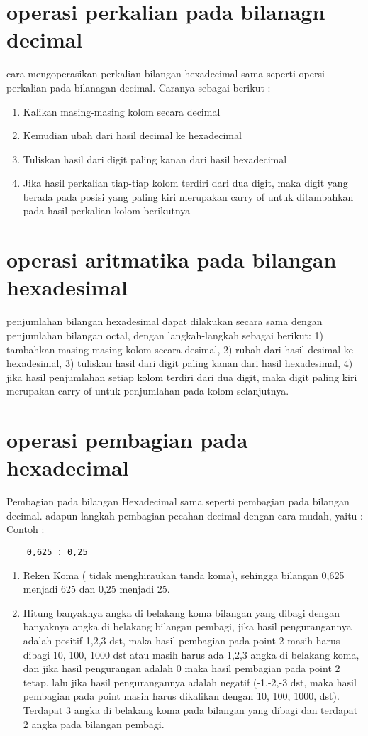 \section{operasi perkalian pada bilanagn decimal}
cara mengoperasikan perkalian bilangan hexadecimal sama seperti opersi perkalian pada bilanagan decimal. Caranya sebagai berikut :
	\begin{enumerate}
		\item Kalikan masing-masing kolom secara decimal
		\item Kemudian ubah dari hasil decimal ke hexadecimal
		\item Tuliskan hasil dari digit paling kanan dari hasil hexadecimal
		\item Jika hasil perkalian tiap-tiap kolom terdiri dari dua digit, maka digit yang berada pada posisi yang paling kiri merupakan carry of untuk ditambahkan pada hasil perkalian kolom berikutnya
	\end{enumerate}
\section{operasi aritmatika pada bilangan hexadesimal}
penjumlahan bilangan hexadesimal dapat dilakukan secara sama dengan penjumlahan bilangan octal, dengan langkah-langkah sebagai berikut: 1) tambahkan masing-masing kolom secara desimal, 2) rubah dari hasil desimal ke hexadesimal, 3) tuliskan hasil dari digit paling kanan dari hasil hexadesimal, 4) jika hasil penjumlahan setiap kolom terdiri dari dua digit, maka digit paling kiri merupakan carry of untuk penjumlahan pada kolom selanjutnya.


\section {operasi pembagian pada hexadecimal}
Pembagian pada bilangan Hexadecimal sama seperti pembagian pada bilangan decimal. adapun langkah pembagian pecahan decimal dengan cara mudah, yaitu :
	Contoh : 
	\begin{verbatim}
	0,625 : 0,25
	\end{verbatim}
	\begin{enumerate}
	\item Reken Koma ( tidak menghiraukan tanda koma), sehingga bilangan 0,625 menjadi 625 dan 0,25 menjadi 25.
	\item Hitung banyaknya angka di belakang koma bilangan yang dibagi dengan banyaknya angka di belakang bilangan pembagi, jika hasil pengurangannya adalah positif 1,2,3 dst, maka hasil pembagian pada point 2 masih harus dibagi 10, 100, 1000 dst atau masih harus ada 1,2,3 angka di belakang koma, dan jika hasil pengurangan adalah 0 maka hasil pembagian pada point 2 tetap. lalu jika hasil pengurangannya adalah negatif (-1,-2,-3 dst, maka hasil pembagian pada point masih harus dikalikan dengan 10, 100, 1000, dst). Terdapat 3 angka di belakang koma pada bilangan yang dibagi dan terdapat 2 angka pada bilangan pembagi. 
	\end{enumerate}

